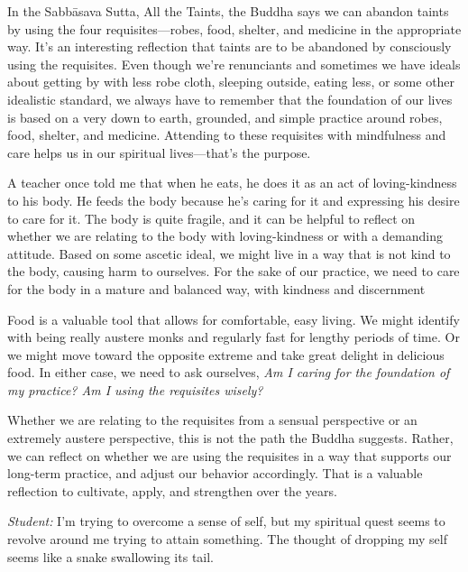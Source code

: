 
In the Sabbāsava Sutta, All the Taints, the Buddha says we can abandon 
taints by using the four requisites---robes, food, shelter, and 
medicine in the appropriate way. It's an interesting reflection that 
taints are to be abandoned by consciously using the requisites. Even 
though we're renunciants and sometimes we have ideals about getting by 
with less robe cloth, sleeping outside, eating less, or some other 
idealistic standard, we always have to remember that the foundation of 
our lives is based on a very down to earth, grounded, and simple 
practice around robes, food, shelter, and medicine. Attending to these 
requisites with mindfulness and care helps us in our spiritual 
lives---that's the purpose.

A teacher once told me that when he eats, he does it as an act of 
loving-kindness to his body. He feeds the body because he's caring for 
it and expressing his desire to care for it. The body is quite fragile, 
and it can be helpful to reflect on whether we are relating to the body 
with loving-kindness or with a demanding attitude. Based on some 
ascetic ideal, we might live in a way that is not kind to the body, 
causing harm to ourselves. For the sake of our practice, we need to 
care for the body in a mature and balanced way, with kindness and 
discernment

Food is a valuable tool that allows for comfortable, easy living. We 
might identify with being really austere monks and regularly fast for 
lengthy periods of time. Or we might move \mbox{toward} the opposite extreme 
and take great delight in delicious food. In either case, we need to 
ask ourselves, \emph{Am I caring for the foundation of my practice? Am 
I using the requisites wisely?}

Whether we are relating to the requisites from a sensual perspective or 
an extremely austere perspective, this is not the path the Buddha 
suggests. Rather, we can reflect on whether we are using the requisites 
in a way that supports our long-term practice, and adjust our behavior 
accordingly. That is a valuable reflection to cultivate, apply, and 
strengthen over the years.


\emph{Student:} I'm trying to overcome a sense of self, but my 
spiritual quest seems to revolve around me trying to attain something. 
The thought of dropping my self seems like a snake swallowing its tail.

